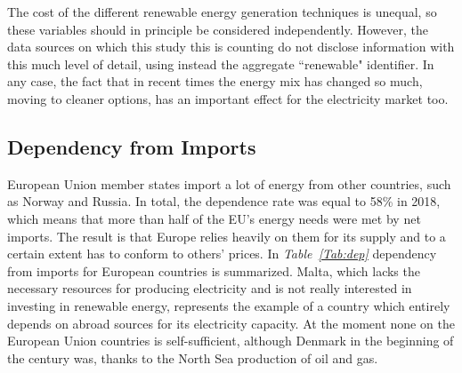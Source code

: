 \documentclass[a4paper,12pt]{book}
\begin{document}
The cost of the different renewable energy generation techniques is unequal, so these variables should in principle be considered independently. However, the data sources on which this study this is counting do not disclose information with this much level of detail, using instead the aggregate ``renewable" identifier. In any case, the fact that in recent times the energy mix has changed so much, moving to cleaner options, has an important effect for the electricity market too.

\subsection{Dependency from Imports}

European Union member states import a lot of energy from other countries, such as Norway and Russia. In total, the dependence rate was equal to 58\% in 2018, which means that more than half of the EU’s energy needs were met by net imports. The result is that Europe relies heavily on them for its supply and to a certain extent has to conform to others' prices. In \textit{Table~\ref{Tab:dep}} dependency from imports for European countries is summarized. Malta, which lacks the necessary resources for producing electricity and is not really interested in investing in renewable energy, represents the example of a country which entirely depends on abroad sources for its electricity capacity. At the moment none on the European Union countries is self-sufficient, although Denmark in the beginning of the century was, thanks to the North Sea production of oil and gas.
\end{document}
